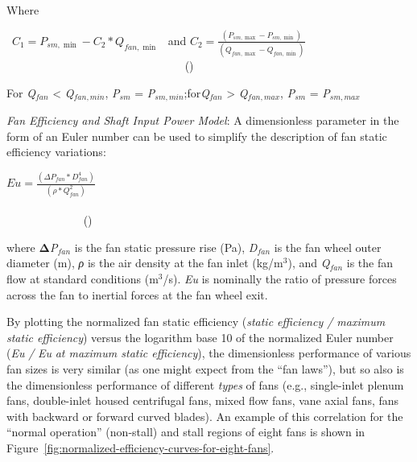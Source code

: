 Where

~\({C_1} = {P_{sm,\min }} - {C_2}*{Q_{fan,\min }}\) ~and \({C_2} = \frac{{\left( {{P_{sm,\max }} - {P_{sm,\min }}} \right)}}{{\left( {{Q_{fan,\max }} - {Q_{fan,\min }}} \right)}}\) ~~~~~~~~~~~~~~~~~~~~~~~~~~~~~~~ ()

For \emph{Q\(_{fan}\)} \textless{} \emph{Q\(_{fan,min}\)}, \emph{P\(_{sm}\)} = \emph{P\(_{sm,min}\)};for\emph{Q\(_{fan}\)} \textgreater{} \emph{Q\(_{fan,max}\)}, \emph{P\(_{sm}\)} = \emph{P\(_{sm,max}\)}

\emph{Fan Efficiency and Shaft Input Power Model}: A dimensionless parameter in the form of an Euler number can be used to simplify the description of fan static efficiency variations:

\(Eu = \frac{{\left( {\Delta {P_{fan}} * D_{fan}^4} \right)}}{{\left( {\rho * Q_{fan}^2} \right)}}\) ~~~~~~~~~~~~~~~~~~~~~~~~~~~~~~~~~~~~~~~~~~~~~~~~~~~~~~~~~~~~~~~~~~~~~~~~~~~~~~~~~~~~~ ()

where \textbf{Δ}\emph{P\(_{fan}\)} is the fan static pressure rise (Pa), \emph{D\(_{fan}\)} is the fan wheel outer diameter (m), \emph{ρ} is the air density at the fan inlet (kg/m\(^{3}\)), and \emph{Q\(_{fan}\)} is the fan flow at standard conditions (m\(^{3}\)/s). \emph{Eu} is nominally the ratio of pressure forces across the fan to inertial forces at the fan wheel exit.

By plotting the normalized fan static efficiency (\emph{static efficiency / maximum static efficiency}) versus the logarithm base 10 of the normalized Euler number (\emph{Eu} \emph{/} \emph{Eu} \emph{at maximum static efficiency}), the dimensionless performance of various fan sizes is very similar (as one might expect from the ``fan laws''), but so also is the dimensionless performance of different \emph{types} of fans (e.g., single-inlet plenum fans, double-inlet housed centrifugal fans, mixed flow fans, vane axial fans, fans with backward or forward curved blades). An example of this correlation for the ``normal operation'' (non-stall) and stall regions of eight fans is shown in Figure~\ref{fig:normalized-efficiency-curves-for-eight-fans}.

